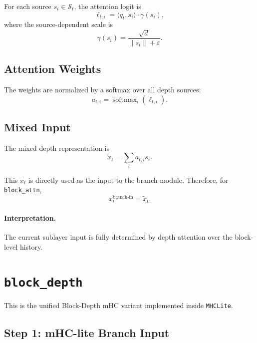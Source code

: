 \documentclass[11pt]{article}
\begin{document}
For each source $s_i \in \mathcal{S}_t$, the attention logit is
\begin{equation}
    \ell_{t,i}
    =
    \langle q_t, s_i \rangle \cdot \gamma(s_i),
\end{equation}
where the source-dependent scale is
\begin{equation}
    \gamma(s_i)
    =
    \frac{\sqrt{d}}{\lVert s_i \rVert + \varepsilon}.
\end{equation}

\subsection{Attention Weights}

The weights are normalized by a softmax over all depth sources:
\begin{equation}
    a_{t,i}
    =
    \operatorname{softmax}_i(\ell_{t,i}).
\end{equation}

\subsection{Mixed Input}

The mixed depth representation is
\begin{equation}
    \tilde{x}_t
    =
    \sum_i a_{t,i} s_i.
\end{equation}

This $\tilde{x}_t$ is directly used as the input to the branch module.
Therefore, for \texttt{block\_attn},
\begin{equation}
    x_t^{\text{branch-in}} = \tilde{x}_t.
\end{equation}

\paragraph{Interpretation.}
The current sublayer input is fully determined by depth attention over the block-level history.

\section{\texttt{block\_depth}}

This is the unified Block-Depth mHC variant implemented inside \texttt{MHCLite}.

\subsection{Step 1: mHC-lite Branch Input}
\end{document}
